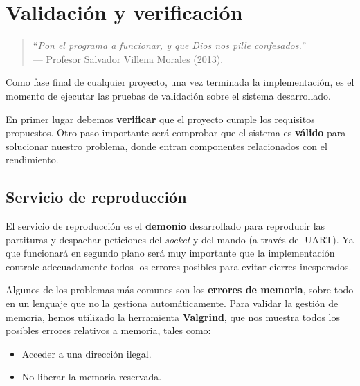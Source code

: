 \chapter{Validación y verificación}
\label{cap:capitulo6}

\begin{quote}
	\begin{flushright}
		\small ``\textit{Pon el programa a funcionar, y que Dios nos pille confesados.}'' \\
		--- Profesor Salvador Villena Morales (2013).
	\end{flushright}
\end{quote}

\vspace{8em}

Como fase final de cualquier proyecto, una vez terminada la implementación, es el momento de ejecutar las pruebas de validación sobre el sistema desarrollado.

En primer lugar debemos \textbf{verificar} que el proyecto cumple los requisitos propuestos. Otro paso importante será comprobar que el sistema es \textbf{válido} para solucionar nuestro problema, donde entran componentes relacionados con el rendimiento.

\newpage

\section{Servicio de reproducción}

El servicio de reproducción es el \textbf{demonio} desarrollado para reproducir las partituras y despachar peticiones del \textit{socket} y del mando (a través del \acrshort{UART}). Ya que funcionará en segundo plano será muy importante que la implementación controle adecuadamente todos los errores posibles para evitar cierres inesperados.

Algunos de los problemas más comunes son los \textbf{errores de memoria}, sobre todo en un lenguaje que no la gestiona automáticamente. Para validar la gestión de memoria, hemos utilizado la herramienta \textbf{Valgrind}, que nos muestra todos los posibles errores relativos a memoria, tales como:

\begin{itemize}
	\item Acceder a una dirección ilegal.
	\item No liberar la memoria reservada.
\end{itemize}

